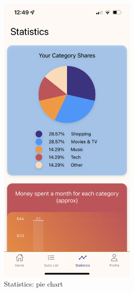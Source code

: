 \documentclass[11pt]{article}
\begin{document}
\begin{figure}[h!]
\begin{minipage}[c]{0.45\textwidth}
        \includegraphics[width=0.6\textwidth, clip]{../../assets/smartphone/stat.PNG}
        \caption{Statistics: pie chart}
        \label{fig:stat}
    \end{minipage}
\end{figure}
\end{document}
